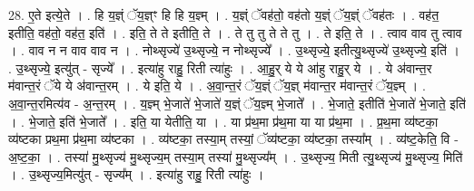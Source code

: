 \documentclass[17pt]{extarticle}
\begin{document}
28. ए॒ते इत्ये॒ते । . हि य॒ज्ञ्ं ॅय॒ज्ञ्ꣳ हि हि य॒ज्ञ्म् । . य॒ज्ञ्ं ॅवह॑तो॒ वह॑तो य॒ज्ञ्ं ॅय॒ज्ञ्ं ॅवह॑तः । . वह॑त॒ इतीति॒ वह॑तो॒ वह॑त॒ इति॑ । . इति॒ ते ते इतीति॒ ते । . ते तु तु ते ते तु । . ते इति॒ ते । . त्वाव वाव तु त्वाव । . वाव न न वाव वाव न । . नोथ्सृज्ये॑ उ॒थ्सृज्ये॒ न नोथ्सृज्ये᳚ । . उ॒थ्सृज्ये॒ इतीत्यु॒थ्सृज्ये॑ उ॒थ्सृज्ये॒ इति॑ । . उ॒थ्सृज्ये॒ इत्यु॑त् - सृज्ये᳚ । . इत्या॑हु राहु॒ रिती त्या॑हुः । . आ॒हु॒र् ये ये आ॑हु राहु॒र् ये । . ये अ॑वान्त॒र म॑वान्त॒रं ॅये ये अ॑वान्त॒रम् । . ये इति॒ ये । . अ॒वा॒न्त॒रं ॅय॒ज्ञ्ं ॅय॒ज्ञ् म॑वान्त॒र म॑वान्त॒रं ॅय॒ज्ञ्म् । . अ॒वा॒न्त॒रमित्य॑व - अ॒न्त॒रम् । . य॒ज्ञ्म् भे॒जाते॑ भे॒जाते॑ य॒ज्ञ्ं ॅय॒ज्ञ्म् भे॒जाते᳚ । . भे॒जाते॒ इतीति॑ भे॒जाते॑ भे॒जाते॒ इति॑ । . भे॒जाते॒ इति॑ भे॒जाते᳚ । . इति॒ या येतीति॒ या । . या प्र॑थ॒मा प्र॑थ॒मा या या प्र॑थ॒मा । . प्र॒थ॒मा व्य॑ष्टका॒ व्य॑ष्टका प्रथ॒मा प्र॑थ॒मा व्य॑ष्टका । . व्य॑ष्टका॒ तस्या॒म् तस्यां॒ ॅव्य॑ष्टका॒ व्य॑ष्टका॒ तस्या᳚म् । . व्य॑ष्ट॒केति॒ वि - अ॒ष्ट॒का॒ । . तस्या॑ मु॒थ्सृज्य॑ मु॒थ्सृज्य॒म् तस्या॒म् तस्या॑ मु॒थ्सृज्य᳚म् । . उ॒थ्सृज्य॒ मिती त्यु॒थ्सृज्य॑ मु॒थ्सृज्य॒ मिति॑ । . उ॒थ्सृज्य॒मित्यु॑त् - सृज्य᳚म् । . इत्या॑हु राहु॒ रिती त्या॑हुः । \newline
\end{document}
